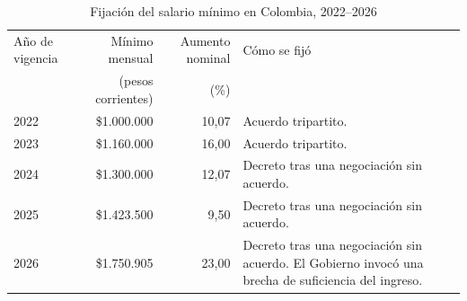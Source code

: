 \begin{table}[H]
\centering\small
\caption{Fijación del salario mínimo en Colombia, 2022--2026}
\label{tab:fijacion-minimo}
\begin{tabularx}{\textwidth}{@{}lrr>{\raggedright\arraybackslash}X@{}}
\toprule
Año de vigencia & Mínimo mensual & Aumento nominal & Cómo se fijó\\
& (pesos corrientes) & (\%) & \\
\midrule
2022 & \$1.000.000 & 10,07 & Acuerdo tripartito.\\
2023 & \$1.160.000 & 16,00 & Acuerdo tripartito.\\
2024 & \$1.300.000 & 12,07 & Decreto tras una negociación sin acuerdo.\\
2025 & \$1.423.500 & 9,50 & Decreto tras una negociación sin acuerdo.\\
2026 & \$1.750.905 & 23,00 & Decreto tras una negociación sin acuerdo. El Gobierno invocó una brecha de suficiencia del ingreso.\\
\bottomrule
\end{tabularx}
\end{table}
